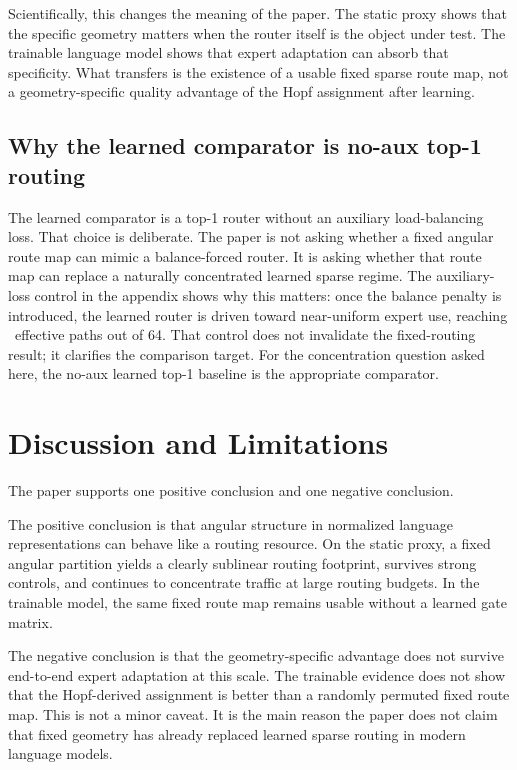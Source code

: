 \documentclass[10pt,letterpaper]{article}
\begin{document}
Scientifically, this changes the meaning of the paper. The static proxy shows that the specific geometry matters when the router itself is the object under test. The trainable language model shows that expert adaptation can absorb that specificity. What transfers is the existence of a usable fixed sparse route map, not a geometry-specific quality advantage of the Hopf assignment after learning.

\subsection{Why the learned comparator is no-aux top-1 routing}
The learned comparator is a top-1 router without an auxiliary load-balancing loss. That choice is deliberate. The paper is not asking whether a fixed angular route map can mimic a balance-forced router. It is asking whether that route map can replace a naturally concentrated learned sparse regime. The auxiliary-loss control in the appendix shows why this matters: once the balance penalty is introduced, the learned router is driven toward near-uniform expert use, reaching \PaperAuxSparseEff\ effective paths out of 64. That control does not invalidate the fixed-routing result; it clarifies the comparison target. For the concentration question asked here, the no-aux learned top-1 baseline is the appropriate comparator.

\section{Discussion and Limitations}
The paper supports one positive conclusion and one negative conclusion.

The positive conclusion is that angular structure in normalized language representations can behave like a routing resource. On the static proxy, a fixed angular partition yields a clearly sublinear routing footprint, survives strong controls, and continues to concentrate traffic at large routing budgets. In the trainable model, the same fixed route map remains usable without a learned gate matrix.

The negative conclusion is that the geometry-specific advantage does not survive end-to-end expert adaptation at this scale. The trainable evidence does not show that the Hopf-derived assignment is better than a randomly permuted fixed route map. This is not a minor caveat. It is the main reason the paper does not claim that fixed geometry has already replaced learned sparse routing in modern language models.
\end{document}
